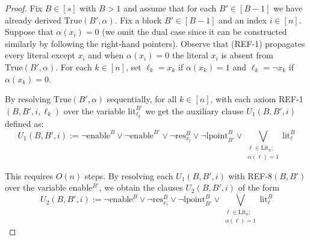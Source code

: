 \begin{proof}
    Fix $B \in [s]$ with $B > 1$ and assume that for each $B' \in [B-1]$ we have already derived $\mathrm{True}(B',\alpha)$. Fix a block $B' \in [B-1]$ and an index $i \in [n]$. Suppose that $\alpha(x_i) = 0$ (we omit the dual case since it can be constructed similarly by following the right-hand pointers). Observe that (REF-1) propagates every literal except $x_i$ and when $\alpha(x_i) = 0$ the literal $x_i$ is absent from $\mathrm{True}(B', \alpha)$. For each $k \in [n]$, set $\ell_k = x_k$ if $\alpha(x_k) = 1$ and $\ell_k = \lnot x_k$ if $\alpha(x_k) = 0$.

    By resolving $\mathrm{True}(B',\alpha)$ sequentially, for all $k \in [n]$, with each axiom REF-1$(B,B',i,\ell_{k})$ over the variable $\text{lit}^{B'}_{\ell_{k}}$ we get the auxiliary clause $U_1(B,B',i)$ defined as:
    \begin{equation}
        U_1(B,B',i) := \lnot \mathrm{enable}^{B} \lor \lnot \mathrm{enable}^{B'} \lor \lnot \mathrm{res}^{B}_{x_i} \lor \lnot \mathrm{lpoint}^{B}_{B'} \lor \bigvee_{\substack{\ell \in \mathrm{Lit}_n :\\ \alpha(\ell) = 1}} \text{lit}^B_{\ell}
    \end{equation}
    
    This requires $O(n)$ steps. By resolving each $U_1(B,B',i)$ with REF-8$(B,B')$ over the variable enable$^{B'}$, we obtain the clauses $U_2(B,B',i)$ of the form
    \begin{equation}
        U_2(B,B',i) := \lnot \mathrm{enable}^{B} \lor \lnot \mathrm{res}^{B}_{x_i} \lor \lnot \mathrm{lpoint}^{B}_{B'} \lor \bigvee_{\substack{\ell \in \mathrm{Lit}_n :\\ \alpha(\ell) = 1}} \text{lit}^B_{\ell}
    \end{equation}


\end{proof}
